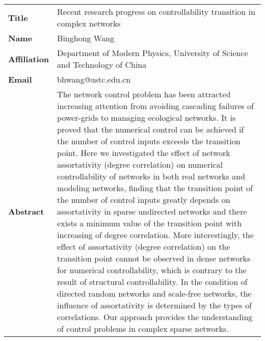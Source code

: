 \documentclass[oneside,A4paper,12pt]{article}
\begin{document}
\begin{longtable}{p{2cm}p{14cm}}
\toprule
\textbf{Title} & Recent research progress on controllability transition in complex networks\\
\textbf{Name} & Binghong Wang\\
\textbf{Affiliation} & Department of Modern Physics, University of Science and Technology of China\\
\textbf{Email} & bhwang@ustc.edu.cn\\
\textbf{Abstract} & The network control problem has been attracted increasing attention from avoiding cascading failures of power-grids to managing ecological networks. It is proved that the numerical control can be achieved if the number of control inputs exceeds the transition point. Here we investigated the effect of network assortativity (degree correlation) on numerical controllability of networks in both real networks and modeling networks, finding that the transition point of the number of control inputs greatly depends on assortativity in sparse undirected networks and there exists a minimum value of the transition point with increasing of degree correlation. More interestingly, the effect of assortativity (degree correlation) on the transition point cannot be observed in dense networks for numerical controllability, which is contrary to the result of structural controllability. In the condition of directed random networks and scale-free networks, the influence of assortativity is determined by the types of correlations. Our approach provides the understanding of control problems in complex sparse networks.\\
\bottomrule
\end{longtable}
\end{document}
